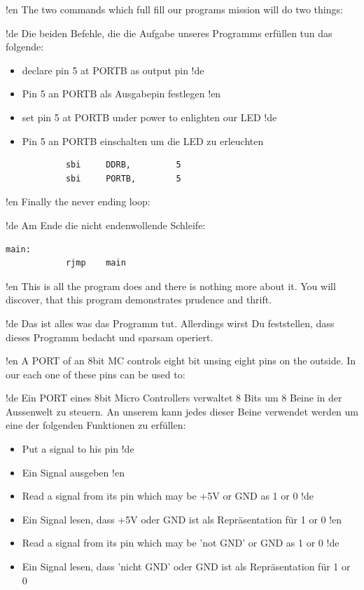 !en The two commands which full fill our programs mission will do two things:

!de Die beiden Befehle, die die Aufgabe unseres Programms erfüllen tun das folgende:

\begin{itemize}
!en   \item  declare pin 5 at PORTB as output pin
!de   \item  Pin 5 an PORTB als Ausgabepin festlegen
!en   \item  set pin 5 at PORTB under power to enlighten our LED
!de   \item  Pin 5 an PORTB einschalten um die LED zu erleuchten
\end{itemize}

\begin{lstlisting}
            sbi     DDRB,         5
            sbi     PORTB,        5
\end{lstlisting}

!en Finally the never ending loop:

!de Am Ende die nicht endenwollende Schleife:

\begin{lstlisting}
main:
            rjmp    main
\end{lstlisting}

!en This is all the program does and there is nothing more about it. You will discover, that this program demonstrates prudence and thrift. 

!de Das ist alles was das Programm tut. Allerdings wirst Du feststellen, dass dieses Programm bedacht und sparsam operiert.


!en A PORT of an 8bit MC controls eight bit unsing eight pins on the outside. In our \at each one of these pins can be used to:

!de Ein PORT eines 8bit Micro Controllers verwaltet 8 Bits um 8 Beine in der Aussenwelt zu steuern. An unserem \at kann jedes dieser Beine verwendet werden um eine der folgenden Funktionen zu erfüllen:

\begin{itemize}
!en   \item Put a signal to his pin
!de   \item Ein Signal ausgeben
!en   \item Read a signal from its pin which may be +5V or GND as 1 or 0
!de   \item Ein Signal lesen, dass +5V oder GND ist als Repräsentation für 1 or 0
!en   \item Read a signal from its pin which may be 'not GND' or GND as 1 or 0
!de   \item Ein Signal lesen, dass 'nicht GND' oder GND ist als Repräsentation für 1 or 0
\end{itemize}

